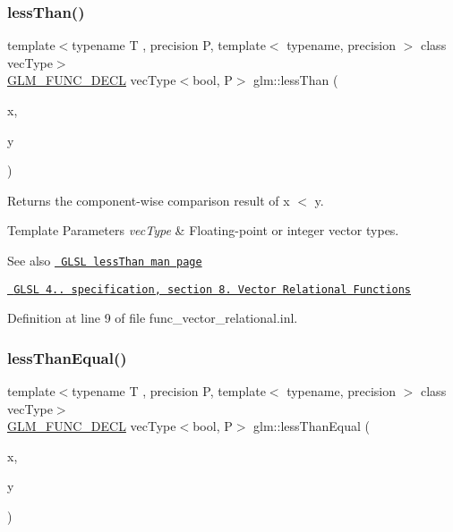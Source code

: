 \subsubsection{\texorpdfstring{lessThan()}{lessThan()}}
{\footnotesize\ttfamily template$<$typename T , precision P, template$<$ typename, precision $>$ class vec\+Type$>$ \\
\mbox{\hyperlink{setup_8hpp_ab2d052de21a70539923e9bcbf6e83a51}{G\+L\+M\+\_\+\+F\+U\+N\+C\+\_\+\+D\+E\+CL}} vec\+Type$<$bool, P$>$ glm\+::less\+Than (\begin{DoxyParamCaption}\item[{vec\+Type$<$ T, P $>$ const \&}]{x,  }\item[{vec\+Type$<$ T, P $>$ const \&}]{y }\end{DoxyParamCaption})}

Returns the component-\/wise comparison result of x $<$ y.


\begin{DoxyTemplParams}{Template Parameters}
{\em vec\+Type} & Floating-\/point or integer vector types.\\
\hline
\end{DoxyTemplParams}
\begin{DoxySeeAlso}{See also}
\href{http://www.opengl.org/sdk/docs/manglsl/xhtml/lessThan.xml}{\texttt{ G\+L\+SL less\+Than man page}} 

\href{http://www.opengl.org/registry/doc/GLSLangSpec.4.20.8.pdf}{\texttt{ G\+L\+SL 4.. specification, section 8. Vector Relational Functions}} 
\end{DoxySeeAlso}


Definition at line 9 of file func\+\_\+vector\+\_\+relational.\+inl.

\mbox{\label{group__core__func__vector__relational_gaaf1d88119f11200c32011de7c5ec0102}} 
\subsubsection{\texorpdfstring{lessThanEqual()}{lessThanEqual()}}
{\footnotesize\ttfamily template$<$typename T , precision P, template$<$ typename, precision $>$ class vec\+Type$>$ \\
\mbox{\hyperlink{setup_8hpp_ab2d052de21a70539923e9bcbf6e83a51}{G\+L\+M\+\_\+\+F\+U\+N\+C\+\_\+\+D\+E\+CL}} vec\+Type$<$bool, P$>$ glm\+::less\+Than\+Equal (\begin{DoxyParamCaption}\item[{vec\+Type$<$ T, P $>$ const \&}]{x,  }\item[{vec\+Type$<$ T, P $>$ const \&}]{y }\end{DoxyParamCaption})}

